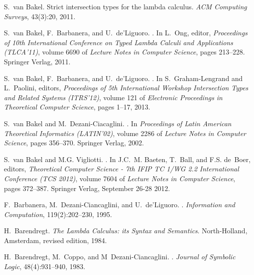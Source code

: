 \documentclass{CSML}
\begin{document}
\begin{thebibliography}{10}
S.~van Bakel.
\newblock Strict intersection types for the lambda calculus.
\newblock \emph{{ACM} Computing Surveys}, 43(3):20, 2011.

S.~van Bakel, F.~Barbanera, and U.~de'Liguoro.
.
\newblock In L.~Ong, editor, \emph{{Proceedings of \emph{10th International
 Conference on Typed Lambda Calculi and Applications} (TLCA'11)}}, volume 6690
 of \emph{Lecture Notes in Computer Science}, pages 213--228. Springer Verlag,
 2011.

S.~van Bakel, F.~Barbanera, and U.~de'Liguoro.
.
\newblock In S.~Graham-Lengrand and L.~Paolini, editors, \emph{{Proceedings of
 5th International Workshop \emph{Intersection Types and Related Systems}
 (ITRS'12)}}, volume 121 of \emph{Electronic Proceedings in Theoretical
 Computer Science}, pages 1--17, 2013.

S.~van Bakel and M.~Dezani-Ciacaglini.
.
\newblock In \emph{Proceedings of Latin American Theoretical Informatics
 (LATIN'02)}, volume 2286 of \emph{Lecture Notes in Computer Science}, pages
 356--370. Springer Verlag, 2002.

S.~van Bakel and {M.G.} Vigliotti.
.
\newblock In J.C.~M. Baeten, T.~Ball, and F.S. de~Boer, editors, {\em
 Theoretical Computer Science - 7th IFIP TC 1/WG 2.2 International Conference
 (TCS 2012)}, volume 7604 of \emph{Lecture Notes in Computer Science}, pages
 372--387. Springer Verlag, September 26-28 2012.

F.~Barbanera, M.~{Dezani-Ciancaglini}, and U.~{de'Liguoro}.
.
\newblock \emph{Information and Computation}, 119(2):202--230, 1995.

H.~Barendregt.
\newblock \emph{{The Lambda Calculus: its Syntax and Semantics}}.
\newblock North-Holland, Amsterdam, revised edition, 1984.

H.~Barendregt, M.~Coppo, and M~{Dezani-Ciancaglini}.
.
\newblock \emph{Journal of Symbolic Logic}, 48(4):931--940, 1983.


\end{thebibliography}
\end{document}
